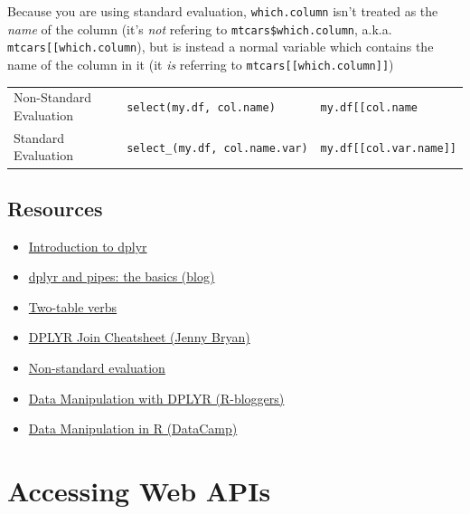 \documentclass[]{book}
\providecommand{\tightlist}{%
  \setlength{\itemsep}{0pt}\setlength{\parskip}{0pt}}
\theoremstyle{definition}
\theoremstyle{definition}
\theoremstyle{remark}
\begin{document}
Because you are using standard evaluation, \texttt{which.column} isn't
treated as the \emph{name} of the column (it's \emph{not} refering to
\texttt{mtcars\$which.column}, a.k.a.
\texttt{mtcars{[}{[}\textquotesingle{}which.column\textquotesingle{}{]}{]}}),
but is instead a normal variable which contains the name of the column
in it (it \emph{is} referring to
\texttt{mtcars{[}{[}which.column{]}{]}})

\begin{longtable}[]{@{}lll@{}}
\toprule
Non-Standard Evaluation & \texttt{select(my.df,\ col.name)} &
\texttt{my.df{[}{[}\textquotesingle{}col.name\textquotesingle{}{]}{]}}\tabularnewline
Standard Evaluation & \texttt{select\_(my.df,\ col.name.var)} &
\texttt{my.df{[}{[}col.var.name{]}{]}}\tabularnewline
\bottomrule
\end{longtable}

\section*{Resources}\label{resources-9}


\begin{itemize}
\tightlist
\item
  \href{https://cran.r-project.org/web/packages/dplyr/vignettes/introduction.html}{Introduction
  to dplyr}
\item
  \href{http://seananderson.ca/2014/09/13/dplyr-intro.html}{dplyr and
  pipes: the basics (blog)}
\item
  \href{https://cran.r-project.org/web/packages/dplyr/vignettes/two-table.html}{Two-table
  verbs}
\item
  \href{http://stat545.com/bit001_dplyr-cheatsheet.html}{DPLYR Join
  Cheatsheet (Jenny Bryan)}
\item
  \href{https://cran.r-project.org/web/packages/dplyr/vignettes/nse.html}{Non-standard
  evaluation}
\item
  \href{https://www.r-bloggers.com/data-manipulation-with-dplyr/}{Data
  Manipulation with DPLYR (R-bloggers)}
\item
  \href{https://www.datacamp.com/courses/dplyr-data-manipulation-r-tutorial}{Data
  Manipulation in R (DataCamp)}
\end{itemize}

\chapter{Accessing Web APIs}\label{apis}
\end{document}
